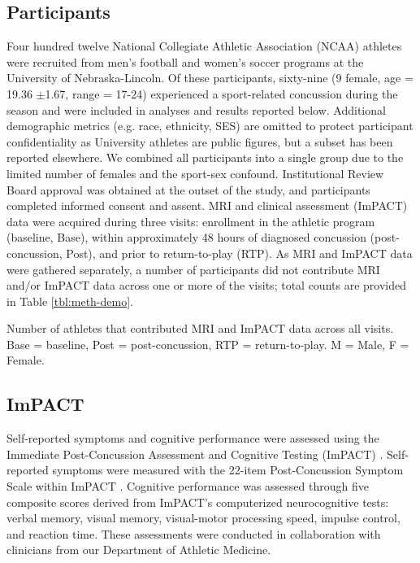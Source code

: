 \documentclass[12pt]{article}
\begin{document}
\subsection{Participants}
\label{ssec:meth-part}
Four hundred twelve National Collegiate Athletic Association (NCAA) athletes were recruited from men's football and women's soccer programs at the University of Nebraska-Lincoln. Of these participants, sixty-nine (9 female, age = 19.36 $\pm$1.67, range = 17-24) experienced a sport-related concussion during the season and were included in analyses and results reported below. Additional demographic metrics (e.g. race, ethnicity, SES) are omitted to protect participant confidentiality as University athletes are public figures, but a subset has been reported elsewhere\autocite{bouchard2024ConcussionRelatedDisruptionsHub}. We combined all participants into a single group due to the limited number of females and the sport-sex confound. Institutional Review Board approval was obtained at the outset of the study, and participants completed informed consent and assent. MRI and clinical assessment (ImPACT) data were acquired during three visits: enrollment in the athletic program (baseline, Base), within approximately 48 hours of diagnosed concussion (post-concussion, Post), and prior to return-to-play (RTP). As MRI and ImPACT data were gathered separately, a number of participants did not contribute MRI and/or ImPACT data across one or more of the visits; total counts are provided in Table \ref{tbl:meth-demo}.

\begin{table}[H]
	\centering
    \footnotesize
	
	\caption{Number of athletes that contributed MRI and ImPACT data across all visits. Base = baseline, Post = post-concussion, RTP = return-to-play. M = Male, F = Female.}
	\label{tbl:meth-demo}
\end{table}


\subsection{ImPACT}
\label{ssec:meth-imp}
Self-reported symptoms and cognitive performance were assessed using the Immediate Post-Concussion Assessment and Cognitive Testing (ImPACT) \autocite{lovell2005ImPACT200540,dessy2017ReviewAssessmentScales}. Self-reported symptoms were measured with the 22-item Post-Concussion Symptom Scale within ImPACT \autocite{lovell2006MeasurementSymptomsFollowing}. Cognitive performance was assessed through five composite scores derived from ImPACT's computerized neurocognitive tests: verbal memory, visual memory, visual-motor processing speed, impulse control, and reaction time. These assessments were conducted in collaboration with clinicians from our Department of Athletic Medicine.
\end{document}
